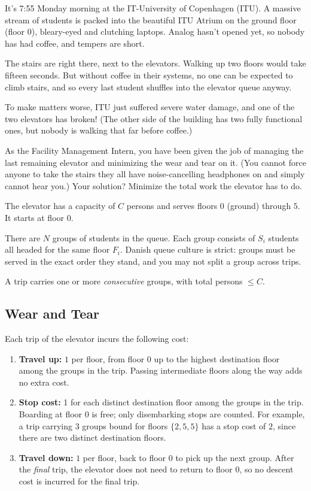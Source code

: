 
It's 7{:}55 Monday morning at the IT-University of Copenhagen (ITU). A massive stream of students
is packed into the beautiful ITU Atrium on the ground floor (floor $0$), bleary-eyed and clutching
laptops. Analog hasn't opened yet, so nobody has had coffee, and tempers are short.

The stairs are right there, next to the elevators. Walking up two floors would take fifteen seconds.
But without coffee in their systems, no one can be expected to climb stairs, and so every last
student shuffles into the elevator queue anyway.

To make matters worse, ITU just suffered severe water damage, and one of the two elevators has
broken! (The other side of the building has two fully functional ones, but nobody is walking that
far before coffee.)

As the Facility Management Intern, you have been given the job of managing the last remaining
elevator and minimizing the wear and tear on it. (You cannot force anyone to take the stairs
they all have noise-cancelling headphones on and simply cannot hear you.) Your solution? Minimize
the total work the elevator has to do.

The elevator has a capacity of $C$ persons and serves floors $0$ (ground) through $5$. It starts
at floor $0$.

There are $N$ groups of students in the queue. Each group consists of $S_i$ students all headed for
the same floor $F_i$. Danish queue culture is strict: groups must be served in the exact order they
stand, and you may not split a group across trips.

A trip carries one or more \emph{consecutive} groups, with total persons $\leq C$.

\subsection*{Wear and Tear}

Each trip of the elevator incurs the following cost:

\begin{enumerate}
    \item \textbf{Travel up:} $1$ per floor, from floor $0$ up to the highest destination floor
    among the groups in the trip. Passing intermediate floors along the way adds no extra cost.
    \item \textbf{Stop cost:} 1 for each distinct destination floor among the groups in the trip.
    Boarding at floor 0 is free; only disembarking stops are counted. For example, a trip carrying
    3 groups bound for floors $\{2, 5, 5\}$ has a stop cost of $2$, since there are two distinct
    destination floors.
    \item \textbf{Travel down:} $1$ per floor, back to floor $0$ to pick up the next group. After
    the \emph{final} trip, the elevator does not need to return to floor $0$, so no descent cost
    is incurred for the final trip.
\end{enumerate}

